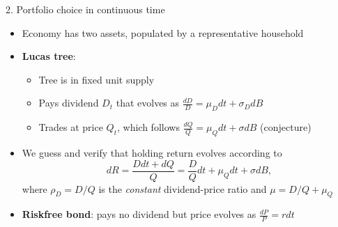 \documentclass[10pt]{beamer}
\begin{document}
\begin{frame}{2. Portfolio choice in continuous time}
\begin{itemize}
\item Economy has two assets, populated by a representative household

\item \textbf{Lucas tree}:
\begin{itemize}
\vspace{1mm}
\item Tree is in fixed unit supply

\vspace{-2mm}
\item Pays dividend $D_t$ that evolves as $\frac{dD}{D} = \mu_D dt + \sigma_D dB$

\vspace{-2mm}
\item Trades at price $Q_t$, which follows $\frac{dQ}{Q} = \mu_Q dt + \sigma dB$ (conjecture)
\end{itemize}

\item We guess and verify that holding return evolves according to 
\begin{equation*}
	dR = \frac{D dt + dQ}{Q} = \frac{D}{Q} dt + \mu_Q dt + \sigma dB,
\end{equation*}
where $\rho_D = D/Q$ is the \textit{constant} dividend-price ratio and $\mu = D/Q + \mu_Q$

\item \textbf{Riskfree bond}: pays no dividend but price evolves as $\frac{dP}{P} = r dt$
\end{itemize}
\end{frame}
\end{document}
